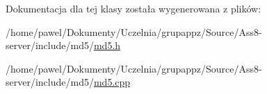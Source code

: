 Dokumentacja dla tej klasy została wygenerowana z plików:\begin{CompactItemize}
\item 
/home/pawel/Dokumenty/Uczelnia/grupappz/Source/Ass8-server/include/md5/\hyperlink{a00010}{md5.h}\item 
/home/pawel/Dokumenty/Uczelnia/grupappz/Source/Ass8-server/include/md5/\hyperlink{a00009}{md5.cpp}\end{CompactItemize}
